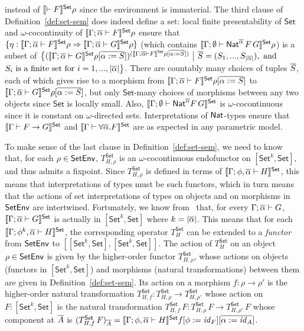 \documentclass{lmcs}
\theoremstyle{plain}\newtheorem{satz}[thm]{Satz}
\newcommand{\set}{\mathsf{Set}}
\renewcommand{\id}{\mathit{id}}
\begin{document}
instead of $\setsem{\vdash F}\rho$ since the environment is
immaterial. The third clause of Definition~\ref{def:set-sem} does
indeed define a set: local finite presentability of $\set$ and
$\omega$-cocontinuity of $\setsem{\Gamma;\ol{\alpha} \vdash F}\rho$
ensure that $\{\eta : \setsem{\Gamma;\ol{\alpha} \vdash F}\rho
\Rightarrow \setsem{\Gamma;\ol{\alpha} \vdash G}\rho\}$ (which
contains $\setsem{\Gamma;\emptyset \vdash
  \Nat^{\ol{\alpha}}\,F\,G}\rho$) is a subset of
$\big\{({\setsem{\Gamma;\ol{\alpha} \vdash G}\rho[\ol{\alpha :=
      S}]})^{(\setsem{\Gamma;\ol{\alpha} \vdash F}\rho[\ol{\alpha :=
      S}])}~\big|~ \ol{S} = (S_1,...,S_{|\ol{\alpha}|}), \mbox{ and }$
$S_i \mbox{ is a finite set for } i =
1,...,|\overline{\alpha}|\big\}$. There are countably many choices of tuples
$\overline{S}$, each of which gives rise to a morphism from
${\setsem{\Gamma;\ol{\alpha} \vdash F}\rho[ \ol{\alpha := S}]}$ to
${\setsem{\Gamma;\ol{\alpha} \vdash G}\rho[\ol{\alpha := S}]}$, but
only $\set$-many choices of morphisms between any two objects since
$\set$ is locally small. Also, $\setsem{\Gamma; \emptyset \vdash
  \Nat^{\ol\alpha} F\,G}$ is $\omega$-cocontinuous since it is
constant on $\omega$-directed sets. Interpretations of $\mathsf{Nat}$-types
ensure that $\setsem{\Gamma \vdash F \to G}$ and $\setsem{\Gamma
  \vdash \forall \ol\alpha. F}$ are as expected in any parametric
model.

To make sense of the last clause in Definition~\ref{def:set-sem}, we
need to know that, for each $\rho \in \mathsf{SetEnv}$, $T^\set_{H,\rho}$ is
an $\omega$-cocontinuous endofunctor on $[\set^k, \set]$, and thus
admits a fixpoint.  Since $T_{H,\rho}^\set$ is defined in terms of
$\setsem{\Gamma;\phi, \ol{\alpha} \vdash H}$, this means that
interpretations of types must be such functors, which in turn means
that the actions of set interpretations of types on objects and on
morphisms in $\mathsf{SetEnv}$ are intertwined. Fortunately, we know
from~\cite{jp19} that, for every $\Gamma; \overline{\alpha} \vdash G$,
$\setsem{\Gamma; \ol{\alpha} \vdash G}$ is actually in $[\set^k,\set]$
where $k = |\overline{\alpha}|$. This means that for each $\setsem{\Gamma;
  \phi^k, \ol{\alpha} \vdash H}$, the corresponding operator
$T^\set_{H}$ can be extended to a {\em functor} from $\mathsf{SetEnv}$ to
$[[\set^k,\set],[\set^k,\set]]$. The action of $T^\set_H$ on an object
$\rho \in \mathsf{SetEnv}$ is given by the higher-order functor
$T_{H,\rho}^\set$, whose actions on objects (functors in $[\set^k,
  \set]$) and morphisms (natural transformations) between them are
given in Definition~\ref{def:set-sem}. Its action on a morphism $f :
\rho \to \rho'$ is the higher-order natural transformation
$T^\set_{H,f} : T^\set_{H,\rho} \to T^\set_{H,\rho'}$ whose action on
$F : [\set^k,\set]$ is the natural transformation $T^\set_{H,f}\, F :
T^\set_{H,\rho}\,F \to T^\set_{H,\rho'}\,F$ whose component at
$\overline{A}$ is $(T^\set_{H,f}\, F)_{\ol{A}} = \setsem{\Gamma;
  \phi,\ol{\alpha} \vdash H}f[\phi := \id_F][\ol{\alpha := \id_A}]$.
\end{document}
